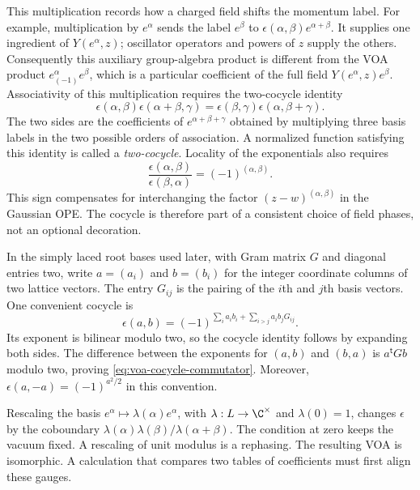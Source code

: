 This multiplication records how a charged field shifts the momentum
label. For example, multiplication by $e^\alpha$ sends the label
$e^\beta$ to $\epsilon(\alpha,\beta)e^{\alpha+\beta}$.
It supplies one ingredient of $Y(e^\alpha,z)$; oscillator operators
and powers of $z$ supply the others. Consequently this auxiliary
group-algebra product is different from the VOA product
$e^\alpha_{(-1)}e^\beta$, which is a particular coefficient of
the full field $Y(e^\alpha,z)e^\beta$.
Associativity of this multiplication requires the two-cocycle
identity
\[
 \epsilon(\alpha,\beta)\epsilon(\alpha+\beta,\gamma)
 =\epsilon(\beta,\gamma)\epsilon(\alpha,\beta+\gamma).
\]
The two sides are the coefficients of $e^{\alpha+\beta+\gamma}$
obtained by multiplying three basis labels in the two possible
orders of association. A normalized function satisfying this identity
is called a \emph{two-cocycle}.
Locality of the exponentials also requires
\begin{equation}
 \frac{\epsilon(\alpha,\beta)}{\epsilon(\beta,\alpha)}
 =(-1)^{(\alpha,\beta)}.
 \label{eq:voa-cocycle-commutator}
\end{equation}
This sign compensates for interchanging the factor
$(z-w)^{(\alpha,\beta)}$ in the Gaussian OPE. The cocycle is
therefore part of a consistent choice of field phases, not an
optional decoration.

In the simply laced root bases used later, with Gram matrix $G$ and
diagonal entries two, write $a=(a_i)$ and $b=(b_i)$ for the integer
coordinate columns of two lattice vectors. The entry $G_{ij}$ is
the pairing of the $i$th and $j$th basis vectors. One convenient
cocycle is
\begin{equation}
 \epsilon(a,b)=(-1)^{\sum_i a_i b_i+
                              \sum_{i>j}a_i b_jG_{ij}}.
 \label{eq:voa-root-cocycle}
\end{equation}
Its exponent is bilinear modulo two, so the cocycle identity follows
by expanding both sides. The difference between the exponents for
$(a,b)$ and $(b,a)$ is $a^{\mathsf t}Gb$ modulo two, proving
\eqref{eq:voa-cocycle-commutator}. Moreover,
$\epsilon(a,-a)=(-1)^{a^2/2}$ in this convention.

Rescaling the basis $e^\alpha\mapsto\lambda(\alpha)e^\alpha$,
with $\lambda:L\to\C^\times$ and $\lambda(0)=1$, changes
$\epsilon$ by the coboundary
$\lambda(\alpha)\lambda(\beta)/\lambda(\alpha+\beta)$.
The condition at zero keeps the vacuum fixed. A rescaling of unit
modulus is a rephasing. The resulting VOA is isomorphic. A calculation that compares two
tables of coefficients must first align these gauges.

